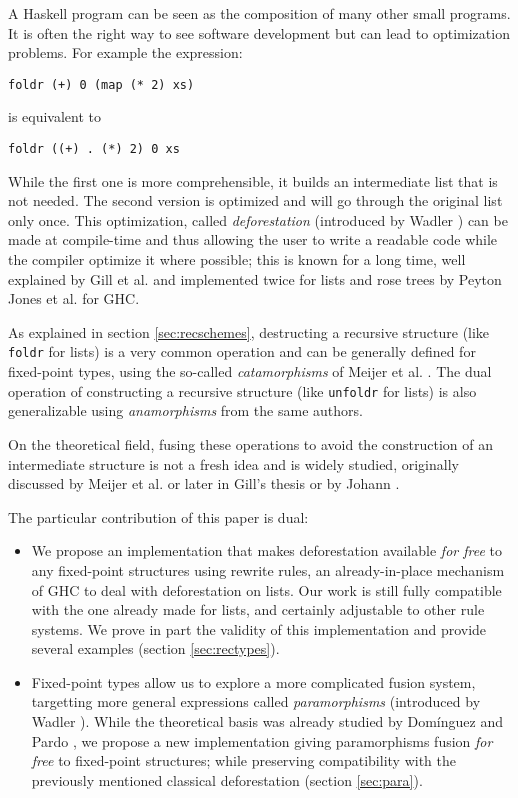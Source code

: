\documentclass[format=sigplan, review=true, anonymous=true]{acmart}
\newcommand{\hs}[1]{\texttt{#1}}
\begin{document}
A Haskell program can be seen as the composition of many other small programs. It is often the right way to see software development but can lead to optimization problems. For example the expression:
\begin{verbatim}
foldr (+) 0 (map (* 2) xs)
\end{verbatim}
is equivalent to
\begin{verbatim}
foldr ((+) . (*) 2) 0 xs
\end{verbatim}

\noindent While the first one is more comprehensible, it builds an intermediate list that is not needed. The second version is optimized and will go through the original list only once.
This optimization, called \emph{deforestation} (introduced by Wadler \cite{WADLER1990231}) can be made at compile-time and thus allowing the user to write a readable code while the compiler optimize it where possible; this is known for a long time, well explained by Gill et al. \cite{Gill:1993:SCD:165180.165214} and implemented twice for lists and rose trees by Peyton Jones et al. \cite{pbr} for GHC.

As explained in section \ref{sec:recschemes}, destructing a recursive structure (like \hs{foldr} for lists) is a very common operation and can be generally defined for fixed-point types, using the so-called \emph{catamorphisms} of Meijer et al. \cite{4cec4a43c86444479dc0003182424795}. The dual operation of constructing a recursive structure (like \hs{unfoldr} for lists) is also generalizable using \emph{anamorphisms} from the same authors.

On the theoretical field, fusing these operations to avoid the construction of an intermediate structure is not a fresh idea and is widely studied, originally discussed by Meijer et al. \cite{4cec4a43c86444479dc0003182424795} or later in Gill's thesis \cite{Gill1996CheapDF} or by Johann \cite{Johann:2002:GSF:641433.641471}.

The particular contribution of this paper is dual:
\begin{itemize}
\item We propose an implementation that makes deforestation available \emph{for free} to any fixed-point structures using rewrite rules, an already-in-place mechanism of GHC to deal with deforestation on lists. Our work is still fully compatible with the one already made for lists, and certainly adjustable to other rule systems. We prove in part the validity of this implementation and provide several examples (section \ref{sec:rectypes}).
\item Fixed-point types allow us to explore a more complicated fusion system, targetting more general expressions called \emph{paramorphisms} (introduced by Wadler \cite{Meertens1992}). While the theoretical basis was already studied by Domínguez and Pardo \cite{paramorphismFusion}, we propose a new implementation giving paramorphisms fusion \emph{for free} to fixed-point structures; while preserving compatibility with the previously mentioned classical deforestation (section \ref{sec:para}).
\end{itemize}
\end{document}

